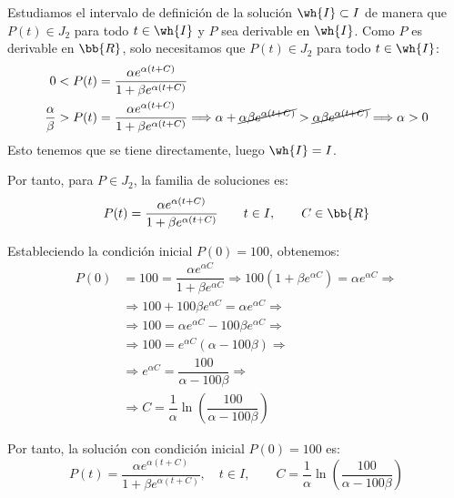 \begin{ejercicio}
\begin{itemize}
        Estudiamos el intervalo de definición de la solución $\wh{I}\subset I$ de manera que $P(t)\in J_2$ para todo $t\in \wh{I}$ y $P$ sea derivable en $\wh{I}$. Como $P$ es derivable en $\bb{R}$, solo necesitamos que $P(t)\in J_2$ para todo $t\in \wh{I}$:
        \begin{align*}
            0&<P(t)=\dfrac{\alpha e^{\alpha (t + C)}}{1+\beta e^{\alpha (t + C)}}\\
            \frac{\alpha}{\beta}&>P(t)=\dfrac{\alpha e^{\alpha (t + C)}}{1+\beta e^{\alpha (t + C)}}
            \Longrightarrow\alpha + \cancel{\alpha\beta e^{\alpha(t+C)}} > \cancel{\alpha\beta e^{\alpha(t+C)}} \Longrightarrow \alpha > 0
        \end{align*}
        Esto tenemos que se tiene directamente, luego $\wh{I}=I$.

        Por tanto, para $P\in J_2$, la familia de soluciones es:
        \begin{equation*}
            P(t) = \dfrac{\alpha e^{\alpha (t + C)}}{1+\beta e^{\alpha (t + C)}} \qquad t\in I,\qquad C\in \bb{R}
        \end{equation*}

        Estableciendo la condición inicial $P(0)=100$, obtenemos:
        \begin{align*}
            P(0) &= 100 = \dfrac{\alpha e^{\alpha C}}{1+\beta e^{\alpha C}} \Longrightarrow 100(1+\beta e^{\alpha C}) = \alpha e^{\alpha C} \Longrightarrow \\ &\Longrightarrow 100 + 100\beta e^{\alpha C} = \alpha e^{\alpha C} \Longrightarrow \\ &\Longrightarrow 100 = \alpha e^{\alpha C} - 100\beta e^{\alpha C} \Longrightarrow \\ &\Longrightarrow 100 = e^{\alpha C}(\alpha - 100\beta) \Longrightarrow \\ &\Longrightarrow e^{\alpha C} = \dfrac{100}{\alpha - 100\beta} \Longrightarrow \\ &\Longrightarrow C =\dfrac{1}{\alpha} \ln\left(\dfrac{100}{\alpha - 100\beta}\right)
        \end{align*}
        
        Por tanto, la solución con condición inicial $P(0)=100$ es:
        \begin{equation*}
            P(t) = \dfrac{\alpha e^{\alpha (t + C)}}{1+\beta e^{\alpha (t + C)}}, \quad t\in I, \qquad C=\dfrac{1}{\alpha}\ln\left(\dfrac{100}{\alpha - 100\beta}\right)
        \end{equation*}


\end{itemize}
\end{ejercicio}

